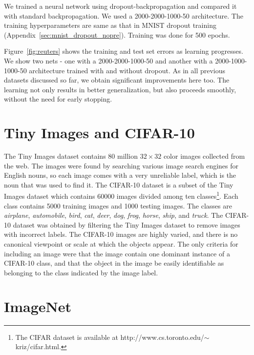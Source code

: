 \documentclass[12pt]{article}
\begin{document}
We trained a neural network using dropout-backpropagation and compared it with
standard backpropagation. We used a 2000-2000-1000-50 architecture. The training
hyperparameters are same as that in MNIST dropout training (Appendix~\ref{sec:mnist_dropout_nopre}). Training was done
for 500 epochs.

Figure~\ref{fig:reuters} shows the training and test set errors as learning
progresses. We show two nets - one with a 2000-2000-1000-50 and
another with a 2000-1000-1000-50 architecture trained with and without dropout.
As in all previous datasets discussed so far, we obtain significant improvements
here too. The learning not only results in better generalization, but also
proceeds smoothly, without the need for early stopping.


\section{Tiny Images and CIFAR-10}
\label{cifarsom}

The Tiny Images dataset contains 80 million $32\times32$ color images
collected from the web. The images were found by searching various
image search engines for English nouns, so each image comes with a
very unreliable label, which is the noun that was used to find it.
The CIFAR-10 dataset is a subset of the Tiny Images dataset which
contains 60000 images divided among ten classes\footnote{The CIFAR dataset is 
available at http://www.cs.toronto.edu/$\sim$kriz/cifar.html. }. Each class contains
5000 training images and 1000 testing images. The classes are \emph{airplane},
\emph{automobile}, \emph{bird}, \emph{cat}, \emph{deer}, \emph{dog},
\emph{frog}, \emph{horse}, \emph{ship}, and \emph{truck}. The CIFAR-10
dataset was obtained by filtering the Tiny Images dataset to remove
images with incorrect labels. The CIFAR-10 images are highly varied,
and there is no canonical viewpoint or scale at which the objects
appear. The only criteria for including an image were that the image
contain one dominant instance of a CIFAR-10 class, and that the object
in the image be easily identifiable as belonging to the class indicated
by the image label. 


\section{ImageNet}
\label{imagenetsom}
\end{document}
